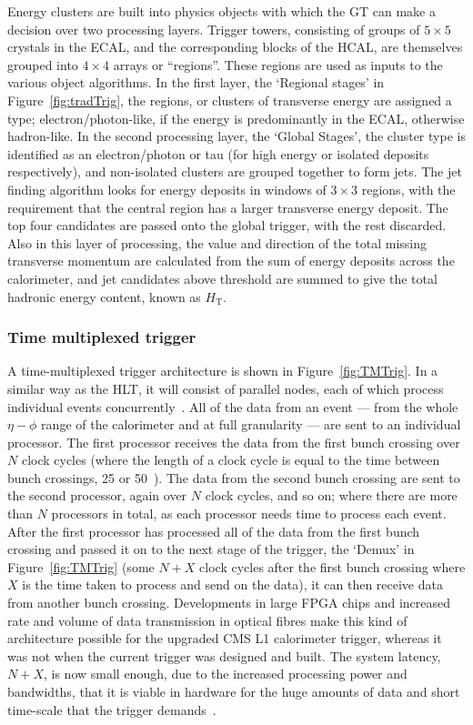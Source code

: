 Energy clusters are built into physics objects with which the \ac{GT} can make a decision over two processing layers. 
Trigger towers, consisting of groups of $5 \times 5$ crystals in the \ac{ECAL}, and the corresponding blocks of the \ac{HCAL}, are themselves grouped into $4 \times 4$ arrays or ``regions''. 
These regions are used as inputs to the various object algorithms.
In the first layer, the `Regional stages' in Figure~\ref{fig:tradTrig}, the regions, or clusters of transverse energy are assigned a type; electron/photon-like, if the energy is predominantly in the \ac{ECAL}, otherwise hadron-like.
In the second processing layer, the `Global Stages', the cluster type is identified as an electron/photon or tau (for high energy or isolated deposits respectively), and non-isolated clusters are grouped together to form jets.
The jet finding algorithm looks for energy deposits in windows of $3 \times 3$ regions, with the requirement that the central region has a larger transverse energy deposit. 
The top four candidates are passed onto the global trigger, with the rest discarded.
Also in this layer of processing, the value and direction of the total missing transverse momentum are calculated from the sum of energy deposits across the calorimeter, 
and jet candidates above threshold are summed to give the total hadronic energy content, known as $H_{\mathrm{T}}$.    




\subsubsection{Time multiplexed trigger}
A time-multiplexed trigger architecture is shown in Figure~\ref{fig:TMTrig}. 
In a similar way as the \ac{HLT}, it will consist of parallel nodes, each of which process individual events concurrently~\cite{TMT_dem}.
All of the data from an event --- from the whole $\eta - \phi$ range of the calorimeter and at full granularity --- are sent to an individual processor. 
The first processor receives the data from the first bunch crossing over $N$ clock cycles (where the length of a clock cycle is equal to the time between bunch crossings, 25 or 50~\ns).
The data from the second bunch crossing are sent to the second processor, again over $N$ clock cycles, and so on; where there are more than $N$ processors in total, as each processor needs time to process each event.
After the first processor has processed all of the data from the first bunch crossing and passed it on to the next stage of the trigger, the `Demux' in Figure~\ref{fig:TMTrig} (some $N+X$ clock cycles after the first bunch crossing where $X$ is the time taken to process and send on the data), it can then receive data from another bunch crossing.
Developments in large \ac{FPGA} chips and increased rate and volume of data transmission in optical fibres make this kind of architecture possible for the upgraded \ac{CMS} \ac{L1} calorimeter trigger, whereas it was not when the current trigger was designed and built. 
The system latency, $N+X$, is now small enough, due to the increased processing power and bandwidths, that it is viable in hardware for the huge amounts of data and short time-scale that the trigger demands~\cite{TMT_dem}. 

